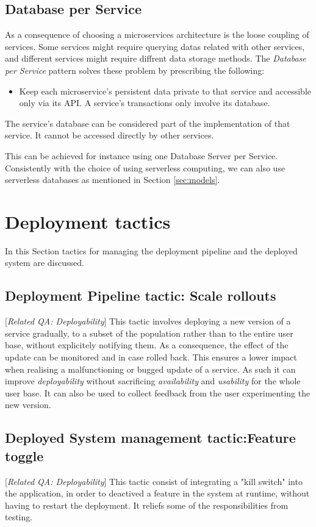 \documentclass{article}
\begin{document}
\subsection*{Database per Service}
As a consequence of choosing a microservices architecture is the loose coupling of services. Some services might require querying datas related with other services, and different services might require diffrent data storage methods.
The \textit{Database per Service} pattern solves these problem by prescribing the following:
\begin{itemize}
\item Keep each microservice's persistent data private to that service and accessible only via its API. A service's transactions only involve its database.
\end{itemize}

The service's database can be considered part of the implementation of that service. It cannot be accessed directly by other services.

This can be achieved for instance using one Database Server per Service.
Consistently with the choice of using serverless computing, we can also use serverless databases as mentioned in Section \ref{sec:models}.

\section{Deployment tactics}

In this Section tactics for managing the deployment pipeline and the deployed system are discussed.

\subsection*{Deployment Pipeline tactic: Scale rollouts}[\textit{Related QA:  Deployability}]
This tactic involves deploying a new version of a service gradually, to a subset of the population rather than to the entire user base, without explicitely notifying them. As a consequence, the effect of the update can be monitored and in case rolled back. This ensures a lower impact when realising a malfunctioning or bugged update of a service. As such it can improve \textit{deployability} without sacrificing \textit{availability} and \textit{usability} for the whole user base.
It can also be used to collect feedback from the user experimenting the new version.
\subsection*{Deployed System management tactic:Feature toggle}[\textit{Related QA: Deployability}]
This tactic consist of integrating a "kill switch" into the application, in order to deactived a feature in the system at runtime, without having to restart the deployment. It reliefs some of the responsibilities from testing.
\end{document}
